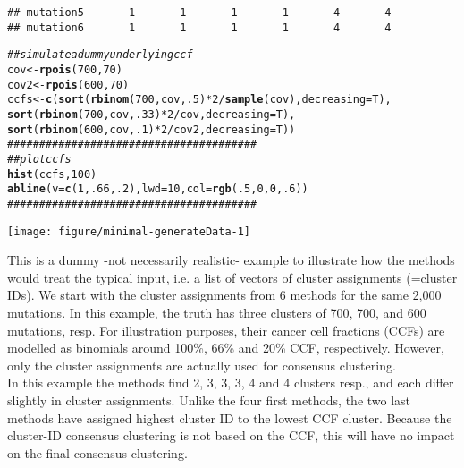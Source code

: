 \documentclass{article}\usepackage[]{graphicx}\usepackage[]{color}
\makeatletter
\newcommand{\hlnum}[1]{\textcolor[rgb]{0.686,0.059,0.569}{#1}}%
\newcommand{\hlcom}[1]{\textcolor[rgb]{0.678,0.584,0.686}{\textit{#1}}}%
\newcommand{\hlopt}[1]{\textcolor[rgb]{0,0,0}{#1}}%
\newcommand{\hlstd}[1]{\textcolor[rgb]{0.345,0.345,0.345}{#1}}%
\newcommand{\hlkwb}[1]{\textcolor[rgb]{0.69,0.353,0.396}{#1}}%
\newcommand{\hlkwc}[1]{\textcolor[rgb]{0.333,0.667,0.333}{#1}}%
\newcommand{\hlkwd}[1]{\textcolor[rgb]{0.737,0.353,0.396}{\textbf{#1}}}%
\newenvironment{kframe}{%
 \def\at@end@of@kframe{}%
 \ifinner\ifhmode%
  \def\at@end@of@kframe{\end{minipage}}%
  \begin{minipage}{\columnwidth}%
 \fi\fi%
 \def\FrameCommand##1{\hskip\@totalleftmargin \hskip-\fboxsep
 \colorbox{shadecolor}{##1}\hskip-\fboxsep
     \hskip-\linewidth \hskip-\@totalleftmargin \hskip\columnwidth}%
 \MakeFramed {\advance\hsize-\width
   \@totalleftmargin\z@ \linewidth\hsize
   \@setminipage}}%
 {\par\unskip\endMakeFramed%
 \at@end@of@kframe}
\newenvironment{knitrout}{}{} %
\makeatother
\begin{document}
\begin{knitrout}
\begin{kframe}
\begin{verbatim}
## mutation5       1       1       1       1       4       4
## mutation6       1       1       1       1       4       4
\end{verbatim}
\begin{alltt}
\hlcom{## simulate a dummy underlying ccf}
\hlstd{cov} \hlkwb{<-} \hlkwd{rpois}\hlstd{(}\hlnum{700}\hlstd{,}\hlnum{70}\hlstd{)}
\hlstd{cov2} \hlkwb{<-} \hlkwd{rpois}\hlstd{(}\hlnum{600}\hlstd{,}\hlnum{70}\hlstd{)}
\hlstd{ccfs} \hlkwb{<-} \hlkwd{c}\hlstd{(}\hlkwd{sort}\hlstd{(}\hlkwd{rbinom}\hlstd{(}\hlnum{700}\hlstd{, cov,} \hlnum{.5}\hlstd{)}\hlopt{*}\hlnum{2}\hlopt{/}\hlkwd{sample}\hlstd{(cov),}\hlkwc{decreasing}\hlstd{=T),}
          \hlkwd{sort}\hlstd{(}\hlkwd{rbinom}\hlstd{(}\hlnum{700}\hlstd{, cov,} \hlnum{.33}\hlstd{)}\hlopt{*}\hlnum{2}\hlopt{/}\hlstd{cov,}\hlkwc{decreasing}\hlstd{=T),}
          \hlkwd{sort}\hlstd{(}\hlkwd{rbinom}\hlstd{(}\hlnum{600}\hlstd{, cov,} \hlnum{.1}\hlstd{)}\hlopt{*}\hlnum{2}\hlopt{/}\hlstd{cov2,}\hlkwc{decreasing}\hlstd{=T))}
\hlcom{## #####################################}
\hlcom{## plot ccfs}
\hlkwd{hist}\hlstd{(ccfs,}\hlnum{100}\hlstd{)}
\hlkwd{abline}\hlstd{(}\hlkwc{v}\hlstd{=}\hlkwd{c}\hlstd{(}\hlnum{1}\hlstd{,}\hlnum{.66}\hlstd{,}\hlnum{.2}\hlstd{),}\hlkwc{lwd}\hlstd{=}\hlnum{10}\hlstd{,}\hlkwc{col}\hlstd{=}\hlkwd{rgb}\hlstd{(}\hlnum{.5}\hlstd{,}\hlnum{0}\hlstd{,}\hlnum{0}\hlstd{,}\hlnum{.6}\hlstd{))}
\hlcom{## #####################################}
\end{alltt}
\end{kframe}

{\centering \texttt{[image: figure/minimal-generateData-1]} 

}



\end{knitrout}

This is a dummy -not necessarily realistic- example to illustrate how
the methods would treat the typical input, i.e. a list of vectors of
cluster assignments (=cluster IDs).
We start with the cluster assignments from 6 methods for the same
2,000 mutations. In this example, the truth has three clusters
of 700, 700, and 600 mutations, resp. For illustration purposes, their
cancer cell fractions (CCFs) are modelled as binomials around 100\%, 66\% and 20\% CCF,
respectively. However, only the cluster assignments are actually used for
consensus clustering.\\

In this example the methods find 2, 3, 3, 3, 4 and 4 clusters resp., and each
differ slightly in cluster assignments. Unlike the four first methods,
the two last methods have assigned highest cluster ID to the lowest
CCF cluster. Because the cluster-ID consensus clustering is not based
on the CCF, this will have no impact on the final consensus clustering.\\
\end{document}
